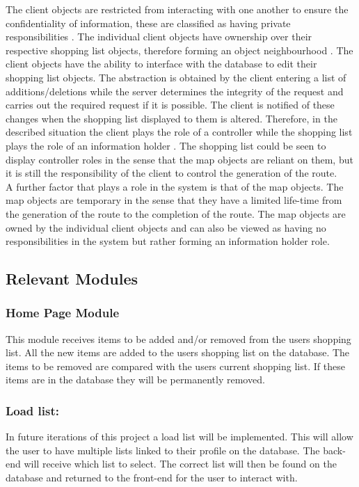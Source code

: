 \documentclass[10pt,twocolumn]{witseiepaper}
\begin{document}
		The client objects are restricted from interacting with one another to ensure the confidentiality of information, these are classified as having private responsibilities \cite{responsibility}. The individual client objects have ownership over their respective shopping list objects, therefore forming an object neighbourhood \cite{responsibility}. The client objects have the ability to interface with the database to edit their shopping list objects. The abstraction is obtained by the client entering a list of additions/deletions while the server determines the integrity of the request and carries out the required request if it is possible. The client is notified of these changes when the shopping list displayed to them is altered. Therefore, in the described situation the client plays the role of a controller while the shopping list plays the role of an information holder \cite{responsibility}. The shopping list could be seen to display controller roles in the sense that the map objects are reliant on them, but it is still the responsibility of the client to control the generation of the route. \\
		
		A further factor that plays a role in the system is that of the map objects. The map objects are temporary in the sense that they have a limited life-time from the generation of the route to the completion of the route. The map objects are owned by the individual client objects and can also be viewed as having no responsibilities in the system but rather forming an information holder role.
		
	
	\subsection{Relevant Modules}
	
		\subsubsection{Home Page Module}
		
		This module receives items to be added and/or removed from the users shopping list. All the new items are added to the users shopping list on the database. The items to be removed are compared with the users current shopping list. If these items are in the database they will be permanently removed.\\
		
		\subsubsection*{Load list:} In future iterations of this project a load list will be implemented. This will allow the user to have multiple lists linked to their profile on the database. The back-end will receive which list to select. The correct list will then be found on the database and returned to the front-end for the user to interact with. \\
		
\end{document}

